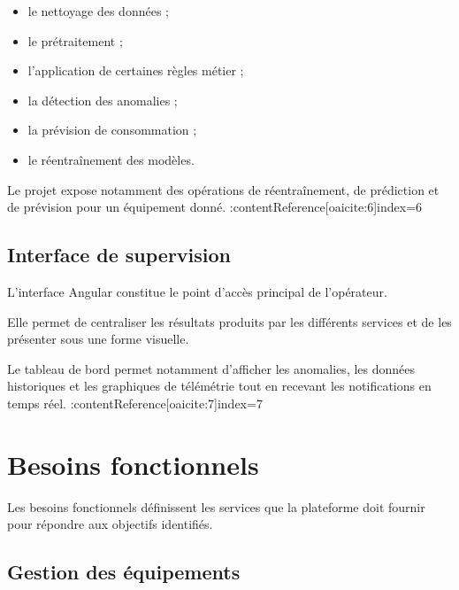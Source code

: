 \begin{itemize}

    \item le nettoyage des données ;

    \item le prétraitement ;

    \item l'application de certaines règles métier ;

    \item la détection des anomalies ;

    \item la prévision de consommation ;

    \item le réentraînement des modèles.

\end{itemize}

Le projet expose notamment des opérations de réentraînement, de prédiction
et de prévision pour un équipement donné. :contentReference[oaicite:6]{index=6}

\subsection{Interface de supervision}

L'interface Angular constitue le point d'accès principal de l'opérateur.

Elle permet de centraliser les résultats produits par les différents
services et de les présenter sous une forme visuelle.

Le tableau de bord permet notamment d'afficher les anomalies, les données
historiques et les graphiques de télémétrie tout en recevant les
notifications en temps réel. :contentReference[oaicite:7]{index=7}


\section{Besoins fonctionnels}

Les besoins fonctionnels définissent les services que la plateforme doit
fournir pour répondre aux objectifs identifiés.

\subsection{Gestion des équipements}

